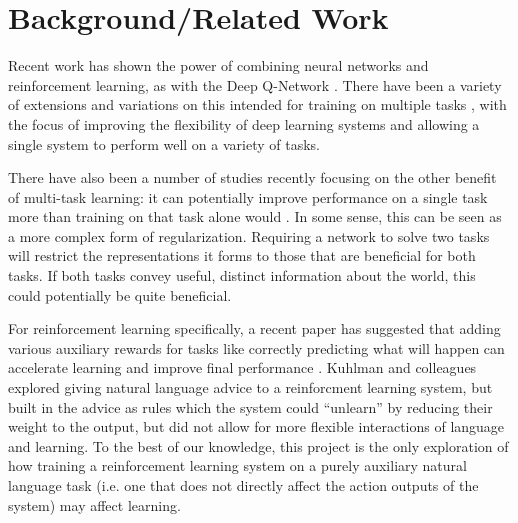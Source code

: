 \documentclass{article} %
\begin{document}
\section{Background/Related Work}
Recent work has shown the power of combining neural networks and reinforcement learning, as with the Deep Q-Network \cite{Mnih2015}. There have been a variety of extensions and variations on this intended for training on multiple tasks \cite[e.g.]{Rusu2015}, with the focus of improving the flexibility of deep learning systems and allowing a single system to perform well on a variety of tasks. \par 
There have also been a number of studies recently focusing on the other benefit of multi-task learning: it can potentially improve performance on a single task more than training on that task alone would \cite[e.g.]{Luong2016}. In some sense, this can be seen as a more complex form of regularization. Requiring a network to solve two tasks will restrict the representations it forms to those that are beneficial for both tasks. If both tasks convey useful, distinct information about the world, this could potentially be quite beneficial. \par
For reinforcement learning specifically, a recent paper has suggested that adding various auxiliary rewards for tasks like correctly predicting what will happen can accelerate learning and improve final performance \cite{Jaderberg2016}. Kuhlman and colleagues \cite{Kuhlmann2004} explored giving natural language advice to a reinforcment learning system, but built in the advice as rules which the system could ``unlearn'' by reducing their weight to the output, but did not allow for more flexible interactions of language and learning. To the best of our knowledge, this project is the only exploration of how training a reinforcement learning system on a purely auxiliary natural language task (i.e. one that does not directly affect the action outputs of the system) may affect learning.
\end{document}
